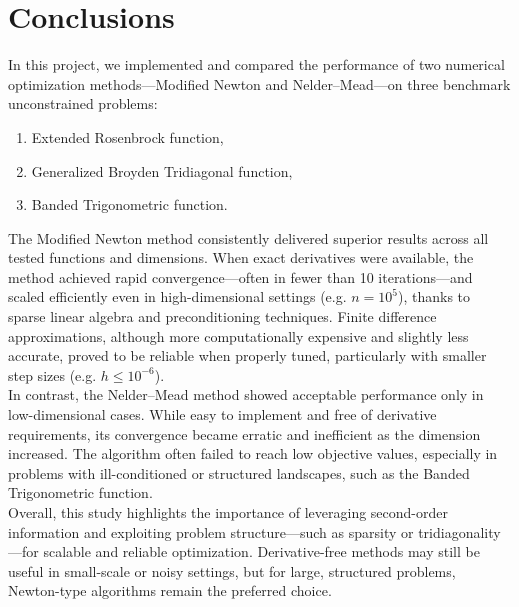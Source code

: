 \documentclass[a4paper,12pt]{article}
\begin{document}
	
	\section{Conclusions}
	
	In this project, we implemented and compared the performance of two numerical optimization methods—Modified Newton and Nelder–Mead—on three benchmark unconstrained problems:
	\begin{enumerate}
	\item Extended Rosenbrock function,
	\item Generalized Broyden Tridiagonal function,
	\item Banded Trigonometric function.
	\end{enumerate}
	
	The Modified Newton method consistently delivered superior results across all tested functions and dimensions. When exact derivatives were available, the method achieved rapid convergence—often in fewer than 10 iterations—and scaled efficiently even in high-dimensional settings (e.g. $n = 10^5$), thanks to sparse linear algebra and preconditioning techniques. Finite difference approximations, although more computationally expensive and slightly less accurate, proved to be reliable when properly tuned, particularly with smaller step sizes (e.g. $h \leq 10^{-6}$).\\
	
	In contrast, the Nelder–Mead method showed acceptable performance only in low-dimensional cases. While easy to implement and free of derivative requirements, its convergence became erratic and inefficient as the dimension increased. The algorithm often failed to reach low objective values, especially in problems with ill-conditioned or structured landscapes, such as the Banded Trigonometric function.\\
	
	Overall, this study highlights the importance of leveraging second-order information and exploiting problem structure—such as sparsity or tridiagonality—for scalable and reliable optimization. Derivative-free methods may still be useful in small-scale or noisy settings, but for large, structured problems, Newton-type algorithms remain the preferred choice.
	
	
	
\end{document}
